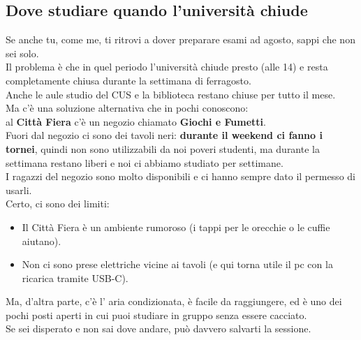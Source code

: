 \documentclass{article}
\begin{document}
\subsection{Dove studiare quando l'università chiude}
Se anche tu, come me, ti ritrovi a dover preparare esami ad agosto, sappi che non sei solo.\\
Il problema è che in quel periodo l'università chiude presto (alle 14) e resta completamente chiusa durante la settimana di ferragosto.\\
Anche le aule studio del CUS e la biblioteca restano chiuse per tutto il mese.\\
Ma c'è una soluzione alternativa che in pochi conoscono:\\
al \textbf{Città Fiera} c'è un negozio chiamato \textbf{Giochi e Fumetti}.\\
Fuori dal negozio ci sono dei tavoli neri: \textbf{durante il weekend ci fanno i tornei}, quindi non sono utilizzabili da noi poveri studenti, ma durante la settimana restano liberi e noi ci abbiamo studiato per settimane.\\
I ragazzi del negozio sono molto disponibili e ci hanno sempre dato il permesso di usarli.\\
Certo, ci sono dei limiti:
\begin{itemize}
\item Il Città Fiera è un ambiente rumoroso (i tappi per le orecchie o le cuffie aiutano).
\item Non ci sono prese elettriche vicine ai tavoli (e qui torna utile il pc con la ricarica tramite USB-C).
\end{itemize}
Ma, d'altra parte, c'è l' aria condizionata, è facile da raggiungere, ed è uno dei pochi posti aperti in cui puoi studiare in gruppo senza essere cacciato.\\
Se sei disperato e non sai dove andare, può davvero salvarti la sessione.
\end{document}

